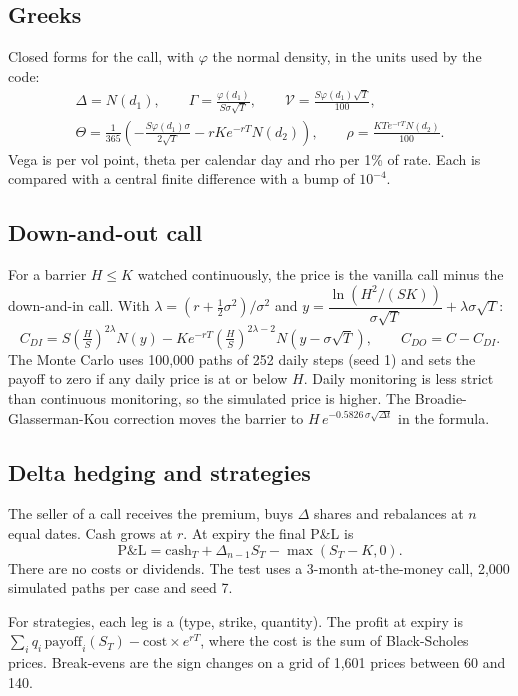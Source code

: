 \documentclass[11pt,a4paper]{article}
\begin{document}
\subsection{Greeks}
Closed forms for the call, with $\varphi$ the normal density, in the units used by the code:
\begin{gather*}
\Delta=N(d_1),\qquad
\Gamma=\frac{\varphi(d_1)}{S\sigma\sqrt T},\qquad
\mathcal{V}=\frac{S\varphi(d_1)\sqrt T}{100},\\
\Theta=\frac{1}{365}\left(-\frac{S\varphi(d_1)\sigma}{2\sqrt T}-rKe^{-rT}N(d_2)\right),\qquad
\rho=\frac{KTe^{-rT}N(d_2)}{100}.
\end{gather*}
Vega is per vol point, theta per calendar day and rho per 1\% of rate. Each is compared with a central finite difference with a bump of $10^{-4}$.

\subsection{Down-and-out call}
For a barrier $H\le K$ watched continuously, the price is the vanilla call minus the down-and-in call. With $\lambda=(r+\tfrac12\sigma^2)/\sigma^2$ and $y=\dfrac{\ln(H^2/(SK))}{\sigma\sqrt T}+\lambda\sigma\sqrt T$:
\[
C_{DI}=S\left(\tfrac HS\right)^{2\lambda}N(y)-Ke^{-rT}\left(\tfrac HS\right)^{2\lambda-2}N(y-\sigma\sqrt T),\qquad
C_{DO}=C-C_{DI}.
\]
The Monte Carlo uses 100,000 paths of 252 daily steps (seed 1) and sets the payoff to zero if any daily price is at or below $H$. Daily monitoring is less strict than continuous monitoring, so the simulated price is higher. The Broadie-Glasserman-Kou correction moves the barrier to $H\,e^{-0.5826\,\sigma\sqrt{\Delta t}}$ in the formula.

\subsection{Delta hedging and strategies}
The seller of a call receives the premium, buys $\Delta$ shares and rebalances at $n$ equal dates. Cash grows at $r$. At expiry the final P\&L is
\[
\text{P\&L}=\text{cash}_T+\Delta_{n-1}S_T-\max(S_T-K,0).
\]
There are no costs or dividends. The test uses a 3-month at-the-money call, 2,000 simulated paths per case and seed 7.

For strategies, each leg is a (type, strike, quantity). The profit at expiry is $\sum_i q_i\,\text{payoff}_i(S_T)-\text{cost}\times e^{rT}$, where the cost is the sum of Black-Scholes prices. Break-evens are the sign changes on a grid of 1,601 prices between 60 and 140.
\end{document}
